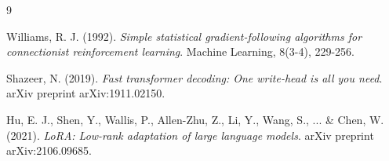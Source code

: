 \documentclass[11pt]{article}
\begin{document}

\begin{thebibliography}{9}

Williams, R. J. (1992).
\textit{Simple statistical gradient-following algorithms for connectionist reinforcement learning}.
Machine Learning, 8(3-4), 229-256.

Shazeer, N. (2019).
\textit{Fast transformer decoding: One write-head is all you need}.
arXiv preprint arXiv:1911.02150.

Hu, E. J., Shen, Y., Wallis, P., Allen-Zhu, Z., Li, Y., Wang, S., ... \& Chen, W. (2021).
\textit{LoRA: Low-rank adaptation of large language models}.
arXiv preprint arXiv:2106.09685.

\end{thebibliography}
\end{document}
